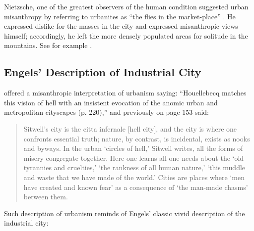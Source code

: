 \documentclass[11pt, letterpaper]{article}
\begin{document}
\begin{spacing}{1.4}
Nietzsche, one of the greatest observers of the human condition suggested urban
misanthropy by referring %
 to urbanites as ``the flies in the market-place'' \citep{nietzsche05}. He expressed dislike for the masses in the city and expressed misanthropic views himself; accordingly, he left the more densely populated areas for solitude in the mountains. See for example \citep{nietzsche05}.


\subsection{Engels' Description of Industrial City}   

\citet{gibson17} offered a misanthropic interpretation of urbanism saying: ``Houellebecq matches this vision of hell with an insistent evocation of the anomic urban and metropolitan cityscapes (p. 220),'' and previously on page 153 said:

\begin{quote}
  Sitwell's city is the citta infernale [hell city], and the city is where one confronts essential truth; nature, by contrast, is incidental, exists as nooks and byways. In the urban `circles of hell,' Sitwell writes, all the forms of misery congregate together.  Here one learns all one needs about the `old tyrannies and cruelties,' `the rankness of all human nature,' `this muddle and waste that we have made of the world.' Cities are places where `men have created and known fear' as a consequence of `the man-made chasms' between them.
\end{quote}

Such description of urbanism reminds of Engels' classic vivid description of the industrial city:


\end{spacing}
\end{document}

